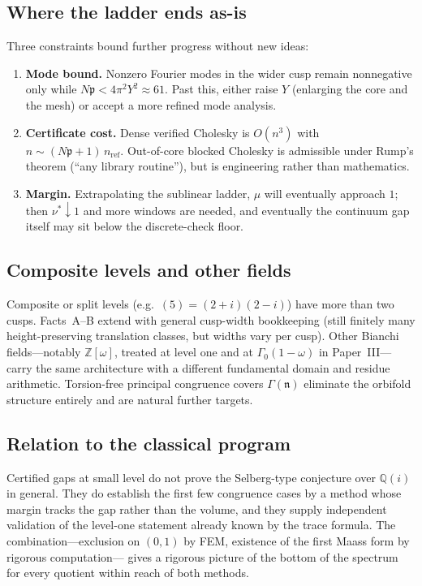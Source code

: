 \documentclass[11pt]{amsart}
\newcommand{\ZZ}{\mathbb{Z}}
\newcommand{\p}{\mathfrak{p}}
\begin{document}
\subsection{Where the ladder ends as-is}

Three constraints bound further progress without new ideas:
\begin{enumerate}
\item \textbf{Mode bound.}  Nonzero Fourier modes in the wider cusp
  remain nonnegative only while $N\p<4\pi^2 Y^2\approx 61$.  Past this,
  either raise $Y$ (enlarging the core and the mesh) or accept a more
  refined mode analysis.
\item \textbf{Certificate cost.}  Dense verified Cholesky is
  $O(n^3)$ with $n\sim(N\p+1)\,n_{\mathrm{ref}}$.  Out-of-core blocked
  Cholesky is admissible under Rump's theorem (``any library routine''),
  but is engineering rather than mathematics.
\item \textbf{Margin.}  Extrapolating the sublinear ladder, $\mu$ will
  eventually approach $1$; then $\nu^*\downarrow 1$ and more windows are
  needed, and eventually the continuum gap itself may sit below the
  discrete-check floor.
\end{enumerate}

\subsection{Composite levels and other fields}

Composite or split levels (e.g.\ $(5)=(2+i)(2-i)$) have more than two
cusps.  Facts~A--B extend with general cusp-width bookkeeping (still
finitely many height-preserving translation classes, but widths vary per
cusp).  Other Bianchi fields---notably $\ZZ[\omega]$, treated at level one
and at $\Gamma_0(1-\omega)$ in Paper~III---carry the same architecture
with a different fundamental domain and residue arithmetic.  Torsion-free
principal congruence covers $\Gamma(\mathfrak{n})$ eliminate the
orbifold structure entirely and are natural further targets.

\subsection{Relation to the classical program}

Certified gaps at small level do not prove the Selberg-type conjecture
over $\mathbb{Q}(i)$ in general.  They do establish the first few
congruence cases by a method whose margin tracks the gap rather than the
volume, and they supply independent validation of the level-one statement
already known by the trace formula.  The combination---exclusion on
$(0,1)$ by FEM, existence of the first Maass form by rigorous computation---
gives a rigorous picture of the bottom of the spectrum for every quotient
within reach of both methods.
\end{document}
